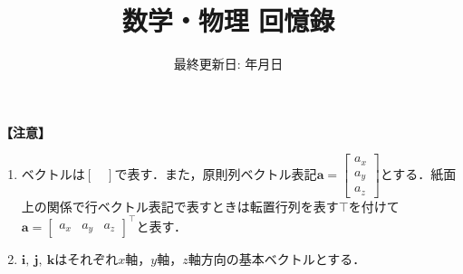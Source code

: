 \documentclass[
	report, paper=a4, head_space=23mm, foot_space=13mm,
	fontsize=9pt, jafontscale=0.9,
	gutter=20mm, line_length=170mm,
	fleqn, twoside
]{jlreq}
\makeatletter
\newcommand*{\themonth}{\two@digits\month}
\newcommand*{\theday}{\two@digits\day}
\renewcommand{\today}{{\the\year}年{\themonth}月{\theday}日}
\makeatother
\begin{document}
\title{\fontsize{40pt}{1\zh} 数学・物理 回憶錄}
\date{\LARGE 最終更新日: \today}
\maketitle


\noindent
\textbf{【注意】}
\begin{enumerate}[leftmargin=15pt]
	\item ベクトルは$[\quad]$で表す．また，原則列ベクトル表記$\bm{a} =
		\begin{bmatrix}
			a_x\\ a_y\\ a_z
		\end{bmatrix}$とする．紙面上の関係で行ベクトル表記で表すときは転置行列を表す$\top$を付けて$\bm{a} =
		{
			\begin{bmatrix}
			a_x & a_y & a_z
		\end{bmatrix}
		}^\top$と表す．
	\item $\bm{i},\ \bm{j},\ \bm{k}$はそれぞれ$x$軸，$y$軸，$z$軸方向の基本ベクトルとする．
\end{enumerate}





























\end{document}
